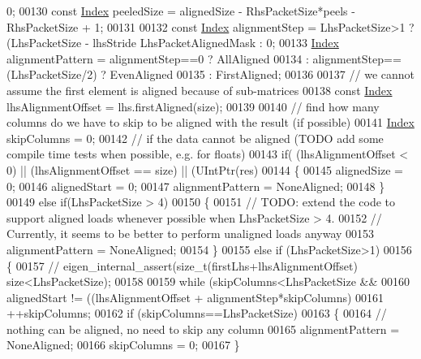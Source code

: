 \begin{DoxyCode}
       0;
00130   \textcolor{keyword}{const} \hyperlink{namespace_eigen_a62e77e0933482dafde8fe197d9a2cfde}{Index} peeledSize = alignedSize - RhsPacketSize*peels - RhsPacketSize + 1;
00131 
00132   \textcolor{keyword}{const} \hyperlink{namespace_eigen_a62e77e0933482dafde8fe197d9a2cfde}{Index} alignmentStep = LhsPacketSize>1 ? (LhsPacketSize - lhsStride %
      LhsPacketAlignedMask : 0;
00133   \hyperlink{namespace_eigen_a62e77e0933482dafde8fe197d9a2cfde}{Index} alignmentPattern = alignmentStep==0 ? AllAligned
00134                        : alignmentStep==(LhsPacketSize/2) ? EvenAligned
00135                        : FirstAligned;
00136 
00137   \textcolor{comment}{// we cannot assume the first element is aligned because of sub-matrices}
00138   \textcolor{keyword}{const} \hyperlink{namespace_eigen_a62e77e0933482dafde8fe197d9a2cfde}{Index} lhsAlignmentOffset = lhs.firstAligned(size);
00139 
00140   \textcolor{comment}{// find how many columns do we have to skip to be aligned with the result (if possible)}
00141   \hyperlink{namespace_eigen_a62e77e0933482dafde8fe197d9a2cfde}{Index} skipColumns = 0;
00142   \textcolor{comment}{// if the data cannot be aligned (TODO add some compile time tests when possible, e.g. for floats)}
00143   \textcolor{keywordflow}{if}( (lhsAlignmentOffset < 0) || (lhsAlignmentOffset == size) || (UIntPtr(res)%
00144   \{
00145     alignedSize = 0;
00146     alignedStart = 0;
00147     alignmentPattern = NoneAligned;
00148   \}
00149   \textcolor{keywordflow}{else} \textcolor{keywordflow}{if}(LhsPacketSize > 4)
00150   \{
00151     \textcolor{comment}{// TODO: extend the code to support aligned loads whenever possible when LhsPacketSize > 4.}
00152     \textcolor{comment}{// Currently, it seems to be better to perform unaligned loads anyway}
00153     alignmentPattern = NoneAligned;
00154   \}
00155   \textcolor{keywordflow}{else} \textcolor{keywordflow}{if} (LhsPacketSize>1)
00156   \{
00157   \textcolor{comment}{//    eigen\_internal\_assert(size\_t(firstLhs+lhsAlignmentOffset)%
       size<LhsPacketSize);}
00158 
00159     \textcolor{keywordflow}{while} (skipColumns<LhsPacketSize &&
00160           alignedStart != ((lhsAlignmentOffset + alignmentStep*skipColumns)%
00161       ++skipColumns;
00162     \textcolor{keywordflow}{if} (skipColumns==LhsPacketSize)
00163     \{
00164       \textcolor{comment}{// nothing can be aligned, no need to skip any column}
00165       alignmentPattern = NoneAligned;
00166       skipColumns = 0;
00167     \}

\end{DoxyCode}
